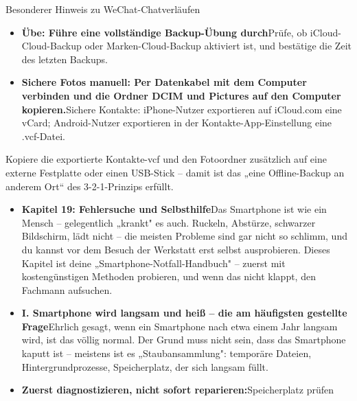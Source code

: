 
Besonderer Hinweis zu WeChat-Chatverläufen


\begin{itemize}
  \item \textbf{Übe: Führe eine vollständige Backup-Übung durch}Prüfe, ob iCloud-Cloud-Backup oder Marken-Cloud-Backup aktiviert ist, und bestätige die Zeit des letzten Backups.
  \item \textbf{Sichere Fotos manuell: Per Datenkabel mit dem Computer verbinden und die Ordner DCIM und Pictures auf den Computer kopieren.}Sichere Kontakte: iPhone-Nutzer exportieren auf iCloud.com eine vCard; Android-Nutzer exportieren in der Kontakte-App-Einstellung eine .vcf-Datei.
\end{itemize}


Kopiere die exportierte Kontakte-vcf und den Fotoordner zusätzlich auf eine externe Festplatte oder einen USB-Stick – damit ist das „eine Offline-Backup an anderem Ort“ des 3-2-1-Prinzips erfüllt.

\begin{itemize}
  \item \textbf{Kapitel 19: Fehlersuche und Selbsthilfe}Das Smartphone ist wie ein Mensch – gelegentlich „krankt" es auch. Ruckeln, Abstürze, schwarzer Bildschirm, lädt nicht – die meisten Probleme sind gar nicht so schlimm, und du kannst vor dem Besuch der Werkstatt erst selbst ausprobieren. Dieses Kapitel ist deine „Smartphone-Notfall-Handbuch" – zuerst mit kostengünstigen Methoden probieren, und wenn das nicht klappt, den Fachmann aufsuchen.
  \item \textbf{I. Smartphone wird langsam und heiß – die am häufigsten gestellte Frage}Ehrlich gesagt, wenn ein Smartphone nach etwa einem Jahr langsam wird, ist das völlig normal. Der Grund muss nicht sein, dass das Smartphone kaputt ist – meistens ist es „Staubansammlung": temporäre Dateien, Hintergrundprozesse, Speicherplatz, der sich langsam füllt.
  \item \textbf{Zuerst diagnostizieren, nicht sofort reparieren:}Speicherplatz prüfen
\end{itemize}


